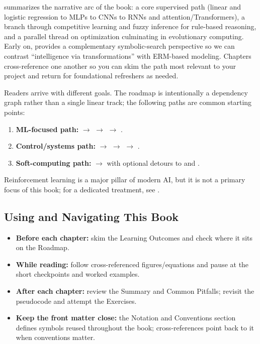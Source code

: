  summarizes the narrative arc of the book: a core supervised path (linear and logistic regression to MLPs to CNNs to RNNs and attention/Transformers), a branch through competitive learning and fuzzy inference for rule-based reasoning, and a parallel thread on optimization culminating in evolutionary computing. Early on,  provides a complementary symbolic-search perspective so we can contrast ``intelligence via transformations'' with ERM-based modeling. Chapters cross-reference one another so you can skim the path most relevant to your project and return for foundational refreshers as needed.

Readers arrive with different goals. The roadmap is intentionally a dependency graph rather than a single linear track; the following paths are common starting points:
\begin{enumerate}
    \item \textbf{ML-focused path:}  $\rightarrow$  $\rightarrow$  $\rightarrow$ .
    \item \textbf{Control/systems path:}  $\rightarrow$  $\rightarrow$  $\rightarrow$ .
    \item \textbf{Soft-computing path:}  $\rightarrow$  with optional detours to  and .
\end{enumerate}
Reinforcement learning is a major pillar of modern AI, but it is not a primary focus of this book; for a dedicated treatment, see \citep{SuttonBarto2018}.

\subsection{Using and Navigating This Book}
\label{sec:intro_using_and_navigating_this_book}
\begin{itemize}\sloppy
    \item \textbf{Before each chapter:} skim the Learning Outcomes and check where it sits on the Roadmap.
    \item \textbf{While reading:} follow cross-referenced figures\slash equations and pause at the short checkpoints and worked examples.
    \item \textbf{After each chapter:} review the Summary and Common Pitfalls; revisit the pseudocode and attempt the Exercises.
    \item \textbf{Keep the front matter close:} the Notation and Conventions section defines symbols reused throughout the book; cross-references point back to it when conventions matter.
\end{itemize}

